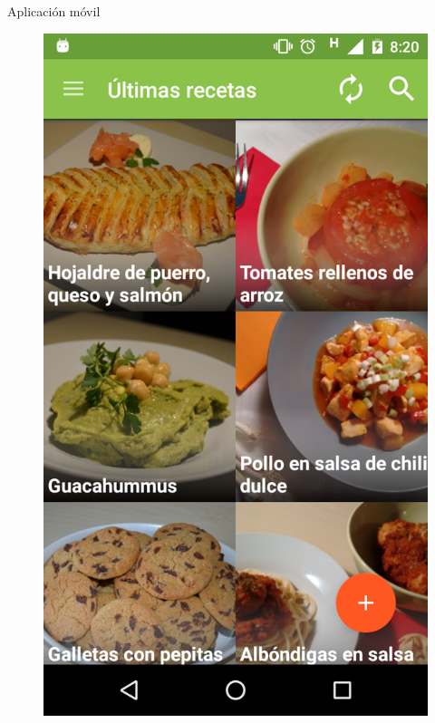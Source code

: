 \documentclass[10pt,xcolor=svgnames]{beamer}
\begin{document}
\begin{frame}{Aplicación móvil}
  \begin{minipage}{\linewidth}
    \centering
    \begin{minipage}{0.4\linewidth}
      \begin{figure}[H]
        \includegraphics[width=\linewidth]{img/captura_03}
      \end{figure}
    \end{minipage}
    \hspace{0.05\linewidth}

\end{minipage}
\end{frame}
\end{document}
